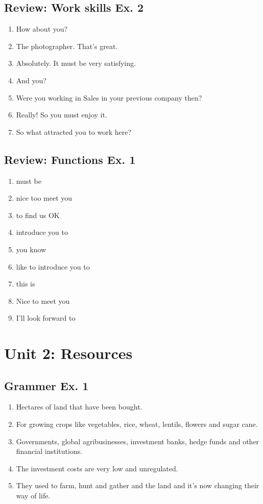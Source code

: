 \documentclass[12pt, a4paper, oneside]{article}
\begin{document}
  \subsection{Review: Work skills Ex. 2}
  \begin{enumerate}[1.]
    \item How about you?
    \item The photographer. That's great.
    \item Absolutely. It must be very satisfying.
    \item And you?
    \item Were you working in Sales in your previous company then?
    \item Really! So you must enjoy it.
    \item So what attracted you to work here?
  \end{enumerate}

  \subsection{Review: Functions Ex. 1}
  \begin{enumerate}[1.]
    \item must be
    \item nice too meet you
    \item to find us OK
    \item introduce you to
    \item you know
    \item like to introduce you to
    \item this is
    \item Nice to meet you
    \item I'll look forward to
  \end{enumerate}

  \newpage
  \section{Unit 2: Resources}
  \subsection{Grammer Ex. 1}
  \begin{enumerate}[1.]
    \item Hectares of land that have been bought.
    \item For growing crops like vegetables, rice, wheat, lentils, flowers and sugar cane.
    \item Governments, global agribusinesses, investment banks, hedge funds and other financial institutions.
    \item The investment costs are very low and unregulated.
    \item They used to farm, hunt and gather and the land and it's now changing their way of life.
  \end{enumerate}
\end{document}

